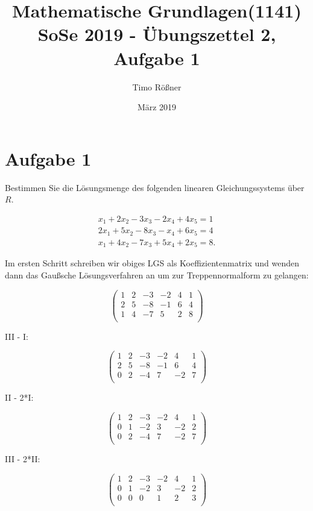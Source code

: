 \documentclass{article}
\title{Mathematische Grundlagen(1141) SoSe 2019 - Übungszettel 2, Aufgabe 1}
\author{Timo Rößner }
\date{März 2019}
\begin{document}
\maketitle

\section*{Aufgabe 1}

Bestimmen Sie die Lösungsmenge des folgenden linearen Gleichungssystems über \(R\).

\[
\begin{split}
x_{1} + 2x_{2} - 3x_{3} - 2x_{4} + 4x_{5} = 1 \\
2x_{1} + 5x_{2} - 8x_{3} - x_{4} + 6x_{5} = 4 \\
x_{1} + 4x_{2} - 7x_{3} + 5x_{4} + 2x_{5} = 8.
\end{split}
\]

Im ersten Schritt schreiben wir obiges LGS als Koeffizientenmatrix und wenden dann das Gaußsche Lösungsverfahren an um zur Treppennormalform zu gelangen:

\[
\left (
\begin{array}{ccccc|c}
  1 & 2 & -3 & -2 & 4 & 1 \\
  2 & 5 & -8 & -1 & 6 & 4 \\
  1 & 4 & -7 & 5 & 2 & 8 \\
\end{array}
\right )
\]

III - I:

\[
\left (
\begin{array}{ccccc|c}
  1 & 2 & -3 & -2 & 4 & 1 \\
  2 & 5 & -8 & -1 & 6 & 4 \\
  0 & 2 & -4 & 7 & -2 & 7 \\
\end{array}
\right )
\]

II - 2*I:

\[
\left (
\begin{array}{ccccc|c}
  1 & 2 & -3 & -2 & 4 & 1 \\
  0 & 1 & -2 & 3 & -2 & 2 \\
  0 & 2 & -4 & 7 & -2 & 7 \\
\end{array}
\right )
\]

III - 2*II:

\[
\left (
\begin{array}{ccccc|c}
  1 & 2 & -3 & -2 & 4 & 1 \\
  0 & 1 & -2 & 3 & -2 & 2 \\
  0 & 0 & 0 & 1 & 2 & 3 \\
\end{array}
\right )
\]
\end{document}
